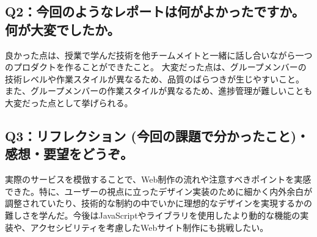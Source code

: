 \documentclass[12pt,a4j]{jarticle}
\begin{document}
\subsection{Q2：今回のようなレポートは何がよかったですか。何が大変でしたか。}
良かった点は、授業で学んだ技術を他チームメイトと一緒に話し合いながら一つのプロダクトを作ることができたこと。
大変だった点は、グループメンバーの技術レベルや作業スタイルが異なるため、品質のばらつきが生じやすいこと。
また、グループメンバーの作業スタイルが異なるため、進捗管理が難しいことも大変だった点として挙げられる。

\subsection{Q3：リフレクション (今回の課題で分かったこと)・感想・要望をどうぞ。}
実際のサービスを模倣することで、Web制作の流れや注意すべきポイントを実感できた。特に、ユーザーの視点に立ったデザイン実装のために細かく内外余白が調整されていたり、技術的な制約の中でいかに理想的なデザインを実現するかの難しさを学んだ。今後はJavaScriptやライブラリを使用したより動的な機能の実装や、アクセシビリティを考慮したWebサイト制作にも挑戦したい。
\end{document}
